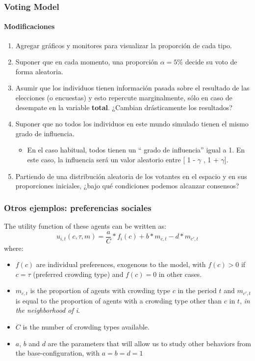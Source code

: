 \documentclass[11pt]{beamer}
\begin{document}
\begin{frame}
	\frametitle{Voting Model}
\framesubtitle{Modificaciones}
\begin{enumerate}
	\item Agregar gráficos y monitores para visualizar la proporción de cada tipo.
	\item Suponer que en cada momento, una proporción $\alpha=5\%$ decide su voto de forma aleatoria.
	\item Asumir que los individuos tienen información pasada sobre el resultado de las elecciones (o encuestas) y esto repercute marginalmente, sólo en caso de desempate en la variable \textbf{total}. ¿Cambian drásticamente los resultados?
	\item Suponer que no todos los individuos en este mundo simulado tienen el mismo grado de influencia.
	\begin{itemize}
		\item En el caso habitual, todos tienen un `` grado de influencia'' igual a 1. En este caso, la influencia será un valor aleatorio entre [ 1 - $\gamma$ , 1 + $\gamma$]. 
	\end{itemize}  
	\item Partiendo de una distribución aleatoria de los votantes en el espacio y en sus proporciones iniciales, ¿bajo qué condiciones podemos alcanzar consensos?  
\end{enumerate}
\end{frame}

\begin{frame}
\frametitle{Otros ejemplos: preferencias sociales}
The utility function of these agents can be written as: 
\begin{equation}
u_{i,t}(c,\tau, m) = \frac{a}{C}*f_i(c) + b*m_{c,t} - d*m_{c',t}
\end{equation} 
where:
\begin{itemize}
\small	\item $ f(c)$ are individual preferences, exogenous to the model, with $ f(c) > 0 $ if $ c = \tau $ (preferred crowding type) and $ f(c) = 0 $ in other cases.
	\item $m_{c,t}$ is the proportion of agents with crowding type $c$ in the period $ t $ and $m_{c',t}$ is equal to the proportion of agents with a crowding type other than $ c $ in $ t $, \textit{in the neighborhood of i}.
	\item $C$ is the number of crowding types available.
	\item $a$, $b$ and $d$ are the parameters that will allow us to study other behaviors from the base-configuration, with $ a = b = d = 1 $
\end{itemize}
\end{frame}
\end{document}

